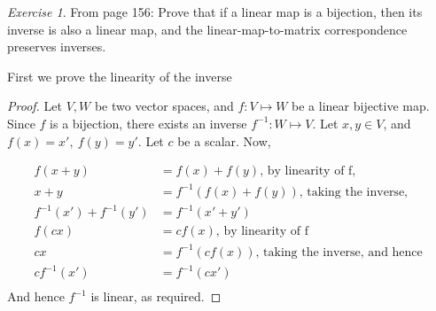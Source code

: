 \documentclass{article}
\theoremstyle{remark}
\newtheorem*{exercise}{Exercise}
\begin{document}
\begin{exercise}
	From page 156: Prove that if a linear map is a bijection, then its inverse is also a linear map, and the linear-map-to-matrix correspondence preserves inverses.
\end{exercise}
First we prove the linearity of the inverse
\begin{proof}
	Let $V, W$ be two vector spaces, and $f: V \mapsto W$ be a linear bijective map.
	Since $f$ is a bijection, there exists an inverse $f^{-1}: W \mapsto V$.
	Let $x, y \in V$, and $f(x) = x', \ f(y) = y'$. Let $c$ be a scalar.
	Now,

\[
\begin{aligned}
f(x+y) &= f(x) + f(y) \text{, by linearity of f, } \\
x + y &= f^{-1}(f(x) + f(y)) \text{, taking the inverse, } \\
f^{-1}(x') + f^{-1}(y') &= f^{-1}(x' + y') \\
f(cx) &= cf(x) \text{, by linearity of f} \\
cx &= f^{-1}(cf(x)) \text{, taking the inverse, and hence } \\
cf^{-1}(x') &= f^{-1}(cx') \\
\end{aligned}
\]
And hence $f^{-1}$ is linear, as required.
\end{proof}
\end{document}
